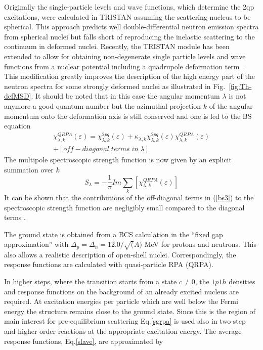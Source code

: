 \documentclass[twocolumn,amsmath,amssymb,10pt,groupedaddress,a4paper]{revtex4}
\begin{document}
\noindent Originally the single-particle levels and wave functions, which determine the 2qp excitations,
were calculated in TRISTAN assuming the scattering nucleus to be spherical.
This approach predicts
well double-differential neutron emission spectra from spherical nuclei but
falls short of reproducing the inelastic scattering to the continuum in deformed nuclei.
Recently, the TRISTAN module has been extended to allow for obtaining non-degenerate
single particle levels and wave functions from a nuclear potential including a quadrupole deformation term~\cite{Wienke:07}.
This modification greatly improves the description of the high energy part of the neutron spectra for some strongly deformed nuclei as illustrated in Fig.~\ref{fig:Th-defMSD}.
It should be noted that in this case the angular momentum $\lambda$ is not anymore a good quantum number
but the azimuthal projection $k$ of the angular momentum onto the deformation axis is still conserved and one is led to the BS equation
\begin{multline}
\chi_{\lambda,k}^{QRPA}(\varepsilon)=  \chi_{\lambda,k}^{2pq}(\varepsilon) + \kappa_{\lambda,k}\chi_{\lambda,k}^{2pq}(\varepsilon)\chi_{\lambda,k}^{QRPA}(\varepsilon)\\
+\left[off-diagonal\;terms\;in\;\lambda\right]\label{bs3}
\end{multline}
The multipole spectroscopic strength function is now given by an explicit summation over $k$ \begin{equation}
S_{\lambda} =-\frac{1}{\pi}Im\sum_k[\chi_{\lambda,k}^{QRPA}(\varepsilon)]\label{sgrpa}
\end{equation}
It can be shown that the contributions of the off-diagonal terms in (\ref{bs3}) to the
spectroscopic strength function are negligibly small compared to the diagonal
terms \cite{nextpaper}.

The ground state is obtained from a BCS calculation
in the {}``fixed gap approximation'' with $\Delta_{p}=\Delta_{n}=12.0/\sqrt{(}A)$
MeV for protons and neutrons. This also allows a realistic description
of open-shell nuclei. Correspondingly, the response functions are
calculated with quasi-particle RPA (QRPA).

In higher steps, where the transition starts from a state $c\not=0$,
the $1p1h$ densities and response functions on the background of
an already excited nucleus are required. At excitation energies per
particle which are well below the Fermi energy the structure remains
close to the ground state. Since this is the region of main interest
for pre-equilibrium scattering Eq.\ref{sgrpa} is used also in two-step
and higher order reactions at the appropriate excitation energy. The
average response functions, Eq.\ref{slave}, are approximated by
\end{document}
